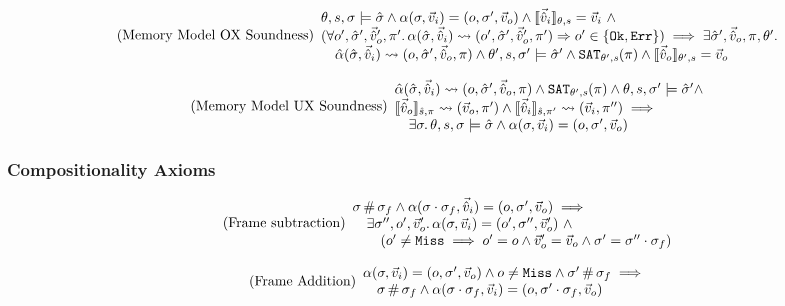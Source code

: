 \begin{equation}
\tag{Memory Model OX Soundness}\label{eq:mem-ox-soundness}
\begin{array}{l}
\theta,s,\st\models\sst \land \ppexecc{\alpha}{\st,\ins}{o,\st',\outs} \land \expeval{\sins}=\ins ~\land \\
(\forall o', \sst', \souts', \pc'\ldotp \ppexec{\alpha}{\sst,\sins}{o',\sst',\souts',\pc'} \Rarr o' \in \{ \Ok, \Err \}) \implies \exists \sst',\souts,\pc,\theta'\ldotp\\
\quad \ppexec{\sym\alpha}{\sst,\sins}{o,\sst',\souts,\pc} \land \theta',s,\st'\models \sst' \land  \SAT[\theta',s](\pc) \land \expeval[\theta',s]{\souts}=\outs
\end{array}
\end{equation}

\begin{equation}
\tag{Memory Model UX Soundness}\label{eq:mem-ux-soundness}
\begin{array}{l}
\ppexec{\sym\alpha}{\sst,\sins}{o,\sst',\souts,\pc} \land \SAT[\theta',s](\pc) \land \theta,s,\st'\models\sst' \land \\
\expeval[\sym s,\pc]{\souts}\rightsquigarrow(\outs,\pc')\land \expeval[\sym s,\pc']{\sins}\rightsquigarrow(\ins,\pc'')\implies\\
\quad \exists \st\ldotp \theta,s,\st\models\sst \land \ppexecc{\alpha}{\st,\ins}{o,\st',\outs}
\end{array}
\end{equation}

\subsubsection{Compositionality Axioms}

\begin{equation}
\tag{Frame subtraction}\label{eq:frame-sub}
\begin{array}{l}
\st\disj\st_f \land \ppexecc{\alpha}{\st\cdot\st_f,\sins}{o, \st',\outs} \implies \\
\quad\exists \st'', o', \outs'\ldotp \ppexecc{\alpha}{\st,\ins}{o', \st'', \outs'} ~\land \\
\qquad(o' \neq \Miss \implies o' = o \land  \outs' = \outs \land \st' = \st'' \cdot \st_f)
\end{array}
\end{equation}

\begin{equation}
\tag{Frame Addition}\label{eq:frame-add}
\begin{array}{l}
\ppexecc{\alpha}{\st,\ins}{o, \st', \outs} \land o \neq \Miss \land \st'\disj\st_f\implies\\
\quad\st \disj \st_f \land \ppexecc{\alpha}{\st\cdot\st_f, \ins}{o, \st'\cdot\st_f, \outs}
\end{array}
\end{equation}

